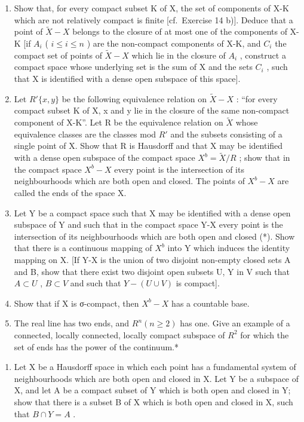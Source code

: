 \begin{enumerate}
\def\labelenumi{\alph{enumi})}
\item
  Show that, for every compact subset K of X, the set of components of X-K which are not relatively compact is finite {[}cf.~Exercise 14 b){]}. Deduce that a point of \(\tilde{X} - X\) belongs to the closure of at most one of the components of X-K {[}if \(A_i\) ( \(i \leqslant i \leqslant n\) ) are the non-compact components of X-K, and \(C_i\) the compact set of points of \(\tilde{X} - X\) which lie in the closure of \(A_i\) , construct a compact space whose underlying set is the sum of X and the sets \(C_i\) , such that X is identified with a dense open subspace of this space{]}.
\item
  Let \(R'\{x, y\}\) be the following equivalence relation on \(\tilde{X}-X\) : ``for every compact subset K of X, x and y lie in the closure of the same non-compact component of X-K''. Let R be the equivalence relation on \(\tilde{X}\) whose equivalence classes are the classes mod \(R'\) and the subsets consisting of a single point of X. Show that R is Hausdorff and that X may be identified with a dense open subspace of the compact space \(X^{b}=\tilde{X}/R\) ; show that in the compact space \(X^{b}-X\) every point is the intersection of its neighbourhoods which are both open and closed. The points of \(X^{b}-X\) are called the ends of the space X.
\item
  Let Y be a compact space such that X may be identified with a dense open subspace of Y and such that in the compact space Y-X every point is the intersection of its neighbourhoods which are both open and closed (*). Show that there is a continuous mapping of \(X^{b}\) into Y which induces the identity mapping on X. {[}If Y-X is the union of two disjoint non-empty closed sets A and B, show that there exist two disjoint open subsets U, Y in V such that \(A \subset U\) , \(B \subset V\) and such that \(Y - (U \cup V)\) is compact{]}.
\item
  Show that if X is σ-compact, then \(X^{b}-X\) has a countable base.
\item
  The real line has two ends, and \(R^{n} (n \geqslant 2)\) has one. Give an example of a connected, locally connected, locally compact subspace of \(R^{2}\) for which the set of ends has the power of the continuum.*
\end{enumerate}

\begin{enumerate}
\def\labelenumi{\arabic{enumi})}
\setcounter{enumi}{19}
\tightlist
\item
  Let X be a Hausdorff space in which each point has a fundamental system of neighbourhoods which are both open and closed in X. Let Y be a subspace of X, and let A be a compact subset of Y which is both open and closed in Y; show that there is a subset B of X which is both open and closed in X, such that \(B \cap Y = A\) .
\end{enumerate}

